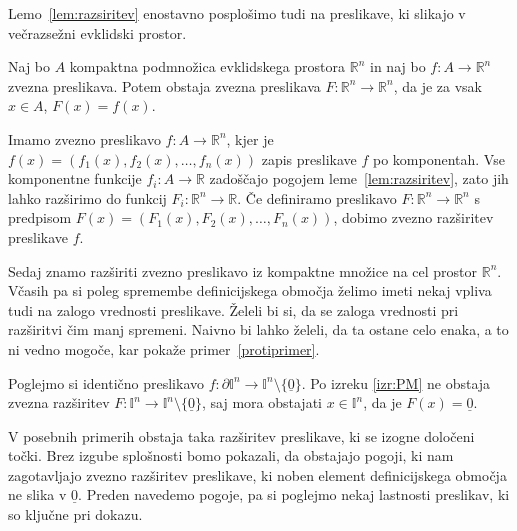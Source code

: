 \documentclass[mat1]{fmfdelo}
\newcommand{\R}{\mathbb R}
\newcommand{\I}{\mathbb I}
\newcommand{\0}{\underline{0}}
\begin{document}
Lemo~\ref{lem:razsiritev} enostavno posplošimo tudi na preslikave, ki slikajo v večrazsežni evklidski prostor.

\begin{posledica}
Naj bo $A$ kompaktna podmnožica evklidskega prostora $\R^n$ in naj bo \mbox{$f : A \to \R^n$} zvezna preslikava. Potem obstaja zvezna preslikava $F : \R^n \to \R^n$, da je za vsak $x \in A$, $F(x) = f(x)$.
\end{posledica}

\begin{dokaz}
Imamo zvezno preslikavo $f : A \to \R^n$, kjer je $f(x) = (f_1(x), f_2(x), \dots , f_n(x))$ zapis preslikave $f$ po komponentah. Vse komponentne funkcije $f_i : A \to \R$ zadoščajo pogojem leme~\ref{lem:razsiritev}, zato jih lahko razširimo do funkcij $F_i : \R^n \to \R$. Če definiramo preslikavo $F : \R^n \to \R^n$ s predpisom $F(x) = (F_1(x), F_2(x), \dots , F_n(x))$, dobimo zvezno razširitev preslikave $f$.
\end{dokaz}
Sedaj znamo razširiti zvezno preslikavo iz kompaktne množice na cel prostor $\R^n$. Včasih pa si poleg spremembe definicijskega območja želimo imeti nekaj vpliva tudi na zalogo vrednosti preslikave. Želeli bi si, da se zaloga vrednosti pri razširitvi čim manj spremeni. Naivno bi lahko želeli, da ta ostane celo enaka, a to ni vedno mogoče, kar pokaže primer~\ref{protiprimer}.

\begin{primer}\label{protiprimer}
Poglejmo si identično preslikavo $f : \partial \I^n \to \I^n \setminus \{ \0 \}$. Po izreku \ref{izr:PM} ne obstaja zvezna razširitev $F : \I^n \to \I^n \setminus \{ \0 \}$, saj mora obstajati $x \in \I^n$, da je $F(x) = \0$. 
\end{primer}

V posebnih primerih obstaja taka razširitev preslikave, ki se izogne določeni točki. Brez izgube splošnosti bomo pokazali, da obstajajo pogoji, ki nam zagotavljajo zvezno razširitev preslikave, ki noben element definicijskega območja ne slika v $\0$. Preden navedemo pogoje, pa si poglejmo nekaj lastnosti preslikav, ki so ključne pri dokazu.
\end{document}
